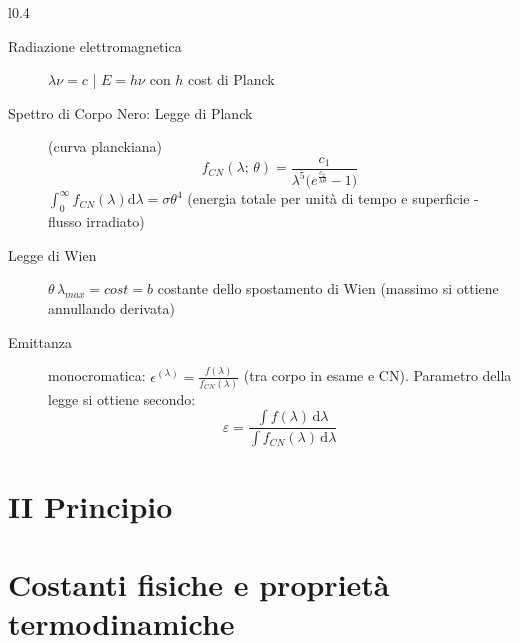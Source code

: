 \documentclass[10pt, oneside]{article}
\begin{document}
\begin{wrapfigure}{l}{0.4\textwidth}
\centering
{}
\vspace{-3cm}
\end{wrapfigure}
\noindent 
\begin{description}
\item[Radiazione elettromagnetica] $\displaystyle \lambda \nu = c$ \bigg| $\displaystyle E = h \nu$ con $h$ cost di Planck
\item[Spettro di Corpo Nero: Legge di Planck] (curva planckiana)
\[\boxed{f_{CN}(\lambda; \, \theta) = \frac{c_1}{\lambda^5 \big(\displaystyle e^{\frac{c_2}{\lambda \theta}} - 1 \big)}}\]
$\displaystyle \int_{0}^{\infty}f_{CN}(\lambda) \mathrm{d}\lambda = \sigma \theta^4$ (energia totale per unità di tempo e superficie - flusso irradiato)
\\
\end{description}

\begin{description}
\item[Legge di Wien] $\displaystyle \theta \, \lambda_{max} = cost = b$ costante dello spostamento di Wien (massimo si ottiene annullando derivata)
\item[Emittanza] monocromatica: $\displaystyle \epsilon^{(\lambda)} = \frac{f(\lambda)}{f_{CN}(\lambda)}$ (tra corpo in esame e CN). Parametro della legge si ottiene secondo:
\[\varepsilon = \frac{\int f(\lambda)\, \mathrm{d}\lambda}{\int f_{CN}(\lambda)\, \mathrm{d}\lambda}\]

\end{description}

\section{II Principio}

\section{Costanti fisiche e proprietà termodinamiche}
\end{document}
